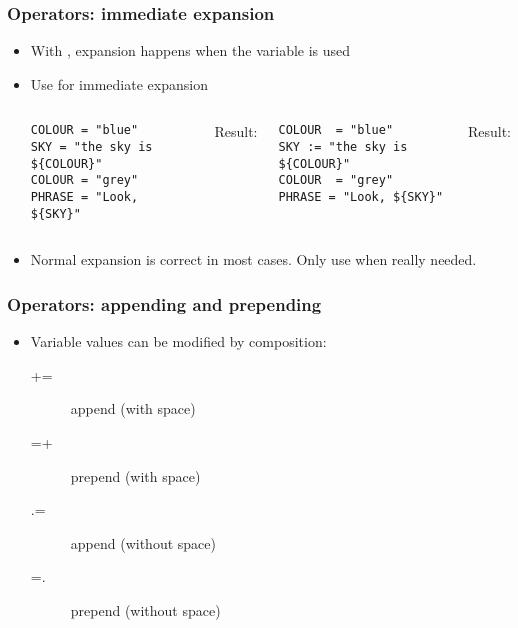 \begin{frame}[fragile]
  \frametitle{Operators: immediate expansion}
  \begin{itemize}
  \item With \code{=}, expansion happens when the variable is used
  \item Use \code{:=} for immediate expansion
  \begin{columns}
    \begin{block}{}
      \begin{verbatim}
COLOUR = "blue"
SKY = "the sky is ${COLOUR}"
COLOUR = "grey"
PHRASE = "Look, ${SKY}"
      \end{verbatim}
    \end{block}
    Result: 
    \break
    \begin{block}{}
      \begin{verbatim}
COLOUR  = "blue"
SKY := "the sky is ${COLOUR}"
COLOUR  = "grey"
PHRASE = "Look, ${SKY}"
      \end{verbatim}
    \end{block}
    Result: 
    \break
  \end{columns}
  \item Normal expansion is correct in most cases. Only use \code{:=} when
    really needed.
  \end{itemize}
\end{frame}

\begin{frame}
  \frametitle{Operators: appending and prepending}
  \begin{itemize}
    \item Variable values can be modified by composition:
      \begin{description}
        \item[+=] append (with space)
        \item[=+] prepend (with space)
        \item[.=] append (without space)
        \item[=.] prepend (without space)
      \end{description}
  \end{itemize}
\end{frame}

